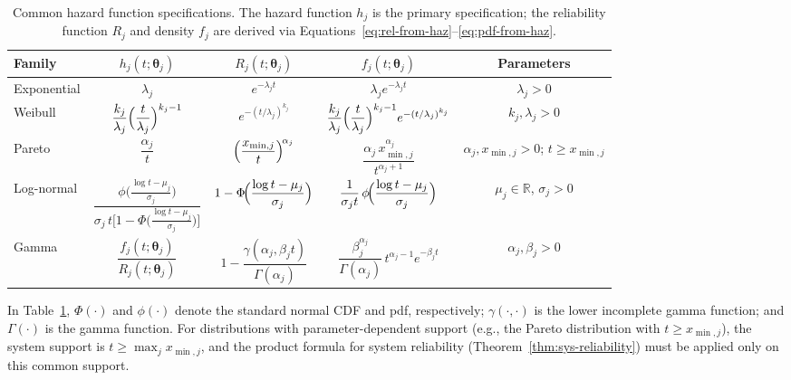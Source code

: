 \documentclass[11pt]{article}
\theoremstyle{definition}
\theoremstyle{plain}
\renewcommand{\v}[1]{\boldsymbol{#1}}
\begin{document}
\begin{table}[ht]
\centering
\caption{Common hazard function specifications.
The hazard function $h_j$ is the primary specification; the reliability
function $R_j$ and density $f_j$ are derived via
Equations~\eqref{eq:rel-from-haz}--\eqref{eq:pdf-from-haz}.}
\label{tab:distributions}
\footnotesize
\renewcommand{\arraystretch}{1.6}
\begin{tabular}{@{}lcccc@{}}
\toprule
\textbf{Family} & $h_j(t; \v{\theta}_j)$ & $R_j(t; \v{\theta}_j)$
    & $f_j(t; \v{\theta}_j)$ & \textbf{Parameters} \\
\midrule
Exponential
    & $\lambda_j$
    & $e^{-\lambda_j t}$
    & $\lambda_j e^{-\lambda_j t}$
    & $\lambda_j > 0$ \\
Weibull
    & $\dfrac{k_j}{\lambda_j}\Bigl(\dfrac{t}{\lambda_j}\Bigr)^{k_j - 1}$
    & $e^{-(t/\lambda_j)^{k_j}}$
    & $\dfrac{k_j}{\lambda_j}\Bigl(\dfrac{t}{\lambda_j}\Bigr)^{k_j - 1}
        e^{-(t/\lambda_j)^{k_j}}$
    & $k_j, \lambda_j > 0$ \\
Pareto
    & $\dfrac{\alpha_j}{t}$
    & $\Bigl(\dfrac{x_{\min,j}}{t}\Bigr)^{\!\alpha_j}$
    & $\dfrac{\alpha_j \, x_{\min,j}^{\alpha_j}}{t^{\alpha_j + 1}}$
    & $\alpha_j, x_{\min,j} > 0$; $t \geq x_{\min,j}$ \\
Log-normal
    & $\dfrac{\phi\bigl(\frac{\log t - \mu_j}{\sigma_j}\bigr)}
        {\sigma_j \, t \bigl[1 - \Phi\bigl(\frac{\log t - \mu_j}{\sigma_j}\bigr)\bigr]}$
    & $1 - \Phi\!\Bigl(\dfrac{\log t - \mu_j}{\sigma_j}\Bigr)$
    & $\dfrac{1}{\sigma_j t}\,
        \phi\!\Bigl(\dfrac{\log t - \mu_j}{\sigma_j}\Bigr)$
    & $\mu_j \in \mathbb{R}$, $\sigma_j > 0$ \\
Gamma\footnotemark
    & $\dfrac{f_j(t; \v{\theta}_j)}{R_j(t; \v{\theta}_j)}$
    & $1 - \dfrac{\gamma(\alpha_j, \beta_j t)}{\Gamma(\alpha_j)}$
    & $\dfrac{\beta_j^{\alpha_j}}{\Gamma(\alpha_j)} \,
        t^{\alpha_j - 1} e^{-\beta_j t}$
    & $\alpha_j, \beta_j > 0$ \\
\bottomrule
\end{tabular}
\end{table}

In Table~\ref{tab:distributions}, $\Phi(\cdot)$ and $\phi(\cdot)$ denote
the standard normal CDF and pdf, respectively; $\gamma(\cdot, \cdot)$ is the
lower incomplete gamma function; and $\Gamma(\cdot)$ is the gamma function.
For distributions with parameter-dependent support (e.g., the Pareto
distribution with $t \geq x_{\min,j}$), the system support is
$t \geq \max_j x_{\min,j}$, and the product formula for system reliability
(Theorem~\ref{thm:sys-reliability}) must be applied only on this common
support.
\end{document}
